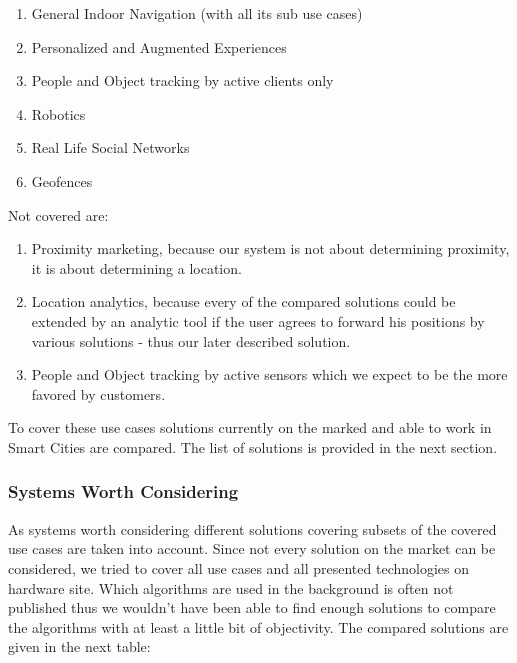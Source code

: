 \begin{enumerate}\itemsep0px
	\item General Indoor Navigation (with all its sub use cases)
	\item Personalized and Augmented Experiences
	\item People and Object tracking by active clients only
	\item Robotics
	\item Real Life Social Networks
	\item Geofences
\end{enumerate}

Not covered are: 
\begin{enumerate}\itemsep0px
	\item Proximity marketing, because our system is not about determining proximity, it is about determining a location.
	\item Location analytics, because every of the compared solutions could be extended by an analytic tool if the user agrees to forward his positions by various solutions - thus our later described solution. 
	\item People and Object tracking by active sensors which we expect to be the more favored by customers.
\end{enumerate}
	
To cover these use cases solutions currently on the marked and able to work in Smart Cities are compared. The list of solutions is provided in the next section.

\subsubsection{Systems Worth Considering}
As systems worth considering different solutions covering subsets of the covered use cases are taken into account. Since not every solution on the market can be considered, we tried to cover all use cases and all presented technologies on hardware site. Which algorithms are used in the background is often not published thus we wouldn't have been able to find enough solutions to compare the algorithms with at least a little bit of objectivity. The compared solutions are given in the next table:
\\

